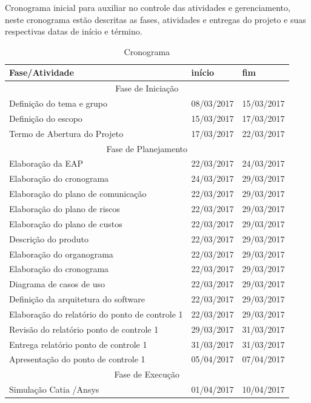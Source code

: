 Cronograma inicial para auxiliar no controle das atividades e gerenciamento, neste cronograma estão descritas as fases, atividades e entregas do projeto e suas respectivas datas de início e término.
\FloatBarrier
\begin{table}[]
\centering
\caption{Cronograma}
\label{tab:cronograma}
\begin{tabular}{|l|l|l|}
\hline
\textbf{Fase/Atividade} & \textbf{início} & \textbf{fim} \\ \hline
\multicolumn{3}{|c|}{Fase de Iniciação} \\ \hline
Definição do tema e grupo & 08/03/2017 & 15/03/2017 \\ \hline
Definição do escopo & 15/03/2017 & 17/03/2017 \\ \hline
Termo de Abertura do Projeto & 17/03/2017 & 22/03/2017 \\ \hline
\multicolumn{3}{|c|}{Fase de Planejamento} \\ \hline
Elaboração da EAP & 22/03/2017 & 24/03/2017 \\ \hline
Elaboração do cronograma & 24/03/2017 & 29/03/2017 \\ \hline
Elaboração do plano de comunicação & 22/03/2017 & 29/03/2017 \\ \hline
Elaboração do plano de riscos & 22/03/2017 & 29/03/2017 \\ \hline
Elaboração do plano de custos & 22/03/2017 & 29/03/2017 \\ \hline
Descrição do produto & 22/03/2017 & 29/03/2017 \\ \hline
Elaboração do organograma & 22/03/2017 & 29/03/2017 \\ \hline
Elaboração do cronograma & 22/03/2017 & 29/03/2017 \\ \hline
Diagrama de casos de uso & 22/03/2017 & 29/03/2017 \\ \hline
Definição da arquitetura do software & 22/03/2017 & 29/03/2017 \\ \hline
Elaboração do relatório do ponto de controle 1 & 22/03/2017 & 29/03/2017 \\ \hline
Revisão do relatório ponto de controle 1 & 29/03/2017 & 31/03/2017 \\ \hline
Entrega relatório ponto de controle 1 & 31/03/2017 & 31/03/2017 \\ \hline
Apresentação do ponto de controle 1 & 05/04/2017 & 07/04/2017 \\ \hline
\multicolumn{3}{|c|}{Fase de Execução} \\ \hline
Simulação Catia /Ansys & 01/04/2017 & 10/04/2017 \\ \hline

\end{tabular}
\end{table}
